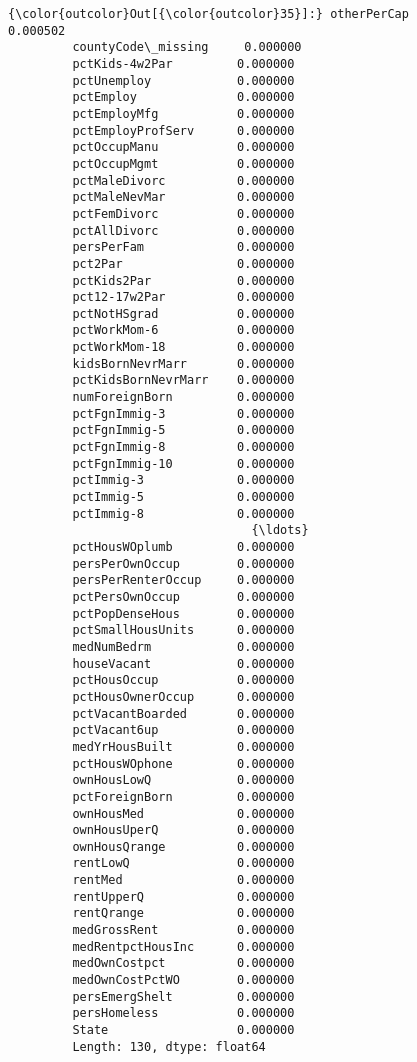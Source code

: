 \documentclass[11pt]{llncs}
\begin{document}
\begin{Verbatim}[commandchars=\\\{\}]
{\color{outcolor}Out[{\color{outcolor}35}]:} otherPerCap            0.000502
         countyCode\_missing     0.000000
         pctKids-4w2Par         0.000000
         pctUnemploy            0.000000
         pctEmploy              0.000000
         pctEmployMfg           0.000000
         pctEmployProfServ      0.000000
         pctOccupManu           0.000000
         pctOccupMgmt           0.000000
         pctMaleDivorc          0.000000
         pctMaleNevMar          0.000000
         pctFemDivorc           0.000000
         pctAllDivorc           0.000000
         persPerFam             0.000000
         pct2Par                0.000000
         pctKids2Par            0.000000
         pct12-17w2Par          0.000000
         pctNotHSgrad           0.000000
         pctWorkMom-6           0.000000
         pctWorkMom-18          0.000000
         kidsBornNevrMarr       0.000000
         pctKidsBornNevrMarr    0.000000
         numForeignBorn         0.000000
         pctFgnImmig-3          0.000000
         pctFgnImmig-5          0.000000
         pctFgnImmig-8          0.000000
         pctFgnImmig-10         0.000000
         pctImmig-3             0.000000
         pctImmig-5             0.000000
         pctImmig-8             0.000000
                                  {\ldots}   
         pctHousWOplumb         0.000000
         persPerOwnOccup        0.000000
         persPerRenterOccup     0.000000
         pctPersOwnOccup        0.000000
         pctPopDenseHous        0.000000
         pctSmallHousUnits      0.000000
         medNumBedrm            0.000000
         houseVacant            0.000000
         pctHousOccup           0.000000
         pctHousOwnerOccup      0.000000
         pctVacantBoarded       0.000000
         pctVacant6up           0.000000
         medYrHousBuilt         0.000000
         pctHousWOphone         0.000000
         ownHousLowQ            0.000000
         pctForeignBorn         0.000000
         ownHousMed             0.000000
         ownHousUperQ           0.000000
         ownHousQrange          0.000000
         rentLowQ               0.000000
         rentMed                0.000000
         rentUpperQ             0.000000
         rentQrange             0.000000
         medGrossRent           0.000000
         medRentpctHousInc      0.000000
         medOwnCostpct          0.000000
         medOwnCostPctWO        0.000000
         persEmergShelt         0.000000
         persHomeless           0.000000
         State                  0.000000
         Length: 130, dtype: float64
\end{Verbatim}
            
\end{document}
